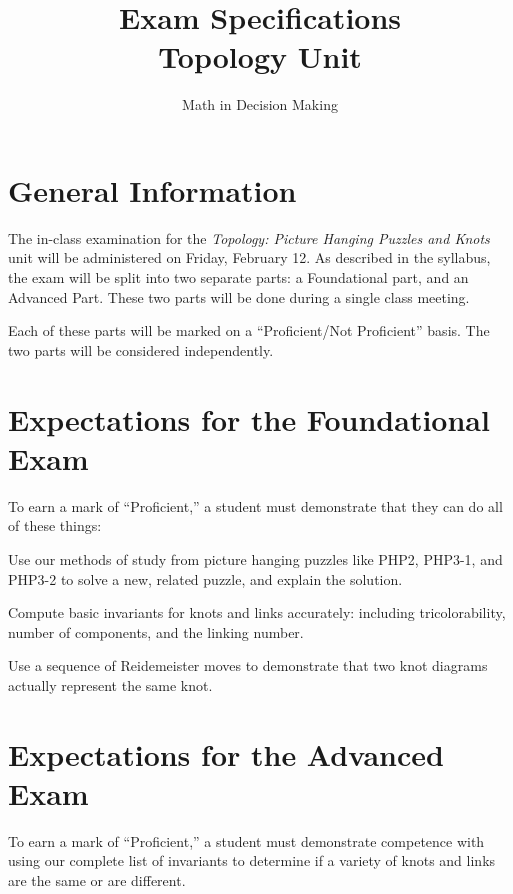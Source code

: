 \documentclass{article}
\begin{document}
\title{Exam Specifications\\ Topology Unit}
\author{Math in Decision Making}

\maketitle

\section*{General Information}

The in-class examination for the \emph{Topology: Picture Hanging Puzzles and Knots} unit will be administered 
on Friday, February 12. As described in the syllabus, the exam will be split into two separate parts: a Foundational
part, and an Advanced Part. These two parts will be done during a single class meeting.

Each of these parts will be marked on a ``Proficient/Not Proficient'' basis. The two parts will be considered 
independently.

\section*{Expectations for the Foundational Exam}

To earn a mark of  ``Proficient,'' a student must demonstrate that they can do all of these things:
\begin{compactitem}
\item Use our methods of study from picture hanging puzzles like PHP2, PHP3-1, and PHP3-2 to solve a new, 
related puzzle, and explain the solution.
\item Compute basic invariants for knots and links accurately: including tricolorability, number of components, and the linking number.
\item Use a sequence of Reidemeister moves to demonstrate that two knot diagrams actually represent the same knot.
\end{compactitem}

\section*{Expectations for the Advanced Exam}

To earn a mark of ``Proficient,'' a student must demonstrate competence with using our complete list of invariants
to determine if a variety of knots and links are the same or are different.
\end{document}
